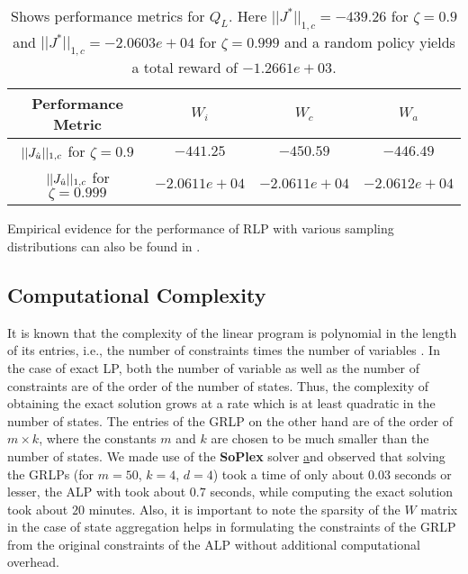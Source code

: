 \FloatBarrier
\begin{table}[H]
\begin{center}
\begin{tabular}{|c|c|c|c|}\hline
Performance Metric&	$W_i$&	$W_c$& $W_a$ \\\hline
$||J_{\hat{u}}||_{1,c}$ for $\zeta=0.9$& $-441.25$&	$-450.59$& $-446.49$ \\\hline
$||J_{\hat{u}}||_{1,c}$ for $\zeta=0.999$& $-2.0611e+04$&	$-2.0611e+04$& $-2.0612e+04$ \\\hline
\end{tabular}
\end{center}
\caption{Shows performance metrics for $Q_L$. Here $||J^*||_{1,c}=-439.26$ for $\zeta=0.9$ and $||J^*||_{1,c}=-2.0603e+04$ for $\zeta=0.999$   and a random policy yields a total reward of $-1.2661e+03
$.}
\label{pref}
\end{table}
Empirical evidence for the performance of RLP with various sampling distributions can also be found in \cite{CST,CS}.
\subsection{Computational Complexity}
It is known that the complexity of the linear program is polynomial in the length of its entries, i.e., the number of constraints times the number of variables \cite{karmarkar,adler}. 
In the case of exact LP, both the number of variable as well as the number of constraints are of the order of the number of states. Thus, the complexity of obtaining the exact solution grows at a rate which is at least quadratic in the number of states. The entries of the GRLP on the other hand are of the order of $m\times k$,  where the constants $m$ and $k$ are chosen to be much smaller than the number of states. We made use of the \textbf{SoPlex} solver \href{http://soplex.zib.de/} and observed that solving the GRLPs (for $m=50$, $k=4$, $d=4$) took a time of only about $0.03$ seconds or lesser, the ALP with took about $0.7$ seconds, while computing the exact solution took about $20$ minutes.
 Also, it is important to note the sparsity of the $W$ matrix in the case of state aggregation helps in formulating the constraints of the GRLP from the original constraints of the ALP without additional computational overhead.
